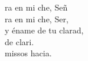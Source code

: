 \begin{cancion}%
	ra en mi che, Señ \\
	ra en mi che, Ser,\\
	y éname de tu clarad, \\
	de clari.\\
	missos hacia.\\
\end{cancion}%
